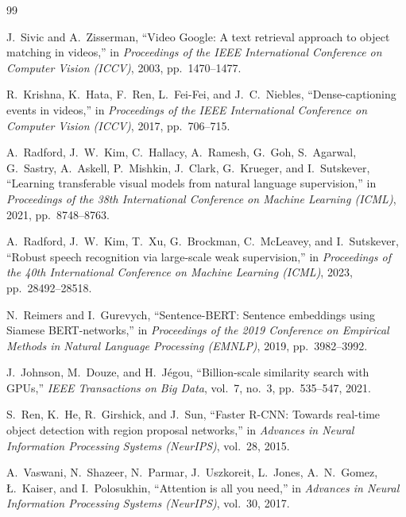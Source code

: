 \documentclass[12pt, a4paper]{report}
\begin{document}
\begin{thebibliography}{99}

J.~Sivic and A.~Zisserman,
``Video Google: A text retrieval approach to object matching in videos,''
in \textit{Proceedings of the IEEE International Conference on Computer Vision (ICCV)},
2003, pp.~1470--1477.

R.~Krishna, K.~Hata, F.~Ren, L.~Fei-Fei, and J.~C.~Niebles,
``Dense-captioning events in videos,''
in \textit{Proceedings of the IEEE International Conference on Computer Vision (ICCV)},
2017, pp.~706--715.

A.~Radford, J.~W.~Kim, C.~Hallacy, A.~Ramesh, G.~Goh, S.~Agarwal,
G.~Sastry, A.~Askell, P.~Mishkin, J.~Clark, G.~Krueger, and I.~Sutskever,
``Learning transferable visual models from natural language supervision,''
in \textit{Proceedings of the 38th International Conference on Machine Learning (ICML)},
2021, pp.~8748--8763.

A.~Radford, J.~W.~Kim, T.~Xu, G.~Brockman, C.~McLeavey, and I.~Sutskever,
``Robust speech recognition via large-scale weak supervision,''
in \textit{Proceedings of the 40th International Conference on Machine Learning (ICML)},
2023, pp.~28492--28518.

N.~Reimers and I.~Gurevych,
``Sentence-BERT: Sentence embeddings using Siamese BERT-networks,''
in \textit{Proceedings of the 2019 Conference on Empirical Methods in Natural Language Processing (EMNLP)},
2019, pp.~3982--3992.

J.~Johnson, M.~Douze, and H.~Jégou,
``Billion-scale similarity search with GPUs,''
\textit{IEEE Transactions on Big Data},
vol.~7, no.~3, pp.~535--547, 2021.

S.~Ren, K.~He, R.~Girshick, and J.~Sun,
``Faster R-CNN: Towards real-time object detection with region proposal networks,''
in \textit{Advances in Neural Information Processing Systems (NeurIPS)},
vol.~28, 2015.

A.~Vaswani, N.~Shazeer, N.~Parmar, J.~Uszkoreit, L.~Jones, A.~N.~Gomez,
\L.~Kaiser, and I.~Polosukhin,
``Attention is all you need,''
in \textit{Advances in Neural Information Processing Systems (NeurIPS)},
vol.~30, 2017.

\end{thebibliography}
\end{document}
